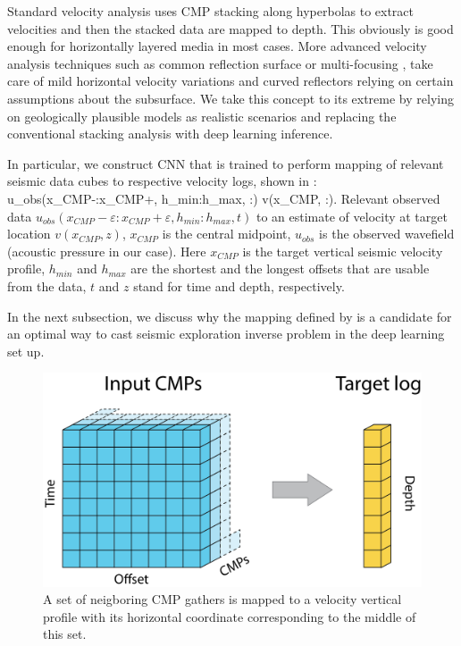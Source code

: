 \documentclass[paper,twocolomn]{geophysics}
\begin{document}
Standard velocity analysis uses CMP stacking along hyperbolas to extract velocities and then the stacked data are mapped to depth. This obviously is good enough for horizontally layered media in most cases. More advanced velocity analysis techniques such as common reflection surface  \citep{mann1999common} or multi-focusing \citep{gelchinsky1999multifocusing}, take care of mild horizontal velocity variations and curved reflectors relying on certain assumptions about the subsurface. We take this concept to its extreme by relying on geologically plausible models as realistic scenarios and replacing the conventional stacking analysis with deep learning inference.

In particular, we construct CNN that is trained to perform mapping of relevant seismic data cubes to respective velocity logs, shown in : 
\beq \label{eq:mapping}
u_{obs}(x_{CMP}-\varepsilon:x_{CMP}+\varepsilon, h_{min}:h_{max}, :) \to v(x_{CMP}, :).
\eeq
Relevant observed data $u_{obs}(x_{CMP}-\varepsilon:x_{CMP}+\varepsilon, h_{min}:h_{max}, t)$  
to an estimate of velocity at target location $v(x_{CMP}, z)$, $x_{CMP}$ is the central midpoint,
$u_{obs}$ is the observed wavefield (acoustic pressure in our case). Here $x_{CMP}$ is the target vertical seismic velocity profile, $h_{min}$ and $h_{max}$ are the shortest and the longest offsets that are usable from the data, $t$ and $z$ stand for time and depth, respectively.

In the next subsection, we discuss why the mapping defined by  is a candidate for an optimal way to cast seismic exploration inverse problem in the deep learning set up.  
\begin{figure}[h!]
	\centering
	\includegraphics[width=0.7\linewidth]{Fig/in_out_shape}
	\caption{A set of neigboring CMP gathers is mapped to a velocity vertical profile with its horizontal coordinate corresponding to the middle of this set.}
	\label{fig:in_out}
\end{figure}
\end{document}
